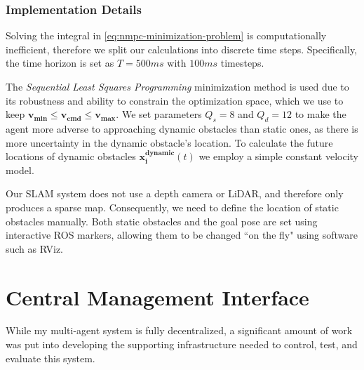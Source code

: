 \subsubsection{Implementation Details}
\label{sec:nmpc-implementation-details}
Solving the integral in \autoref{eq:nmpc-minimization-problem} is computationally inefficient, therefore we split our calculations into discrete time steps. Specifically, the time horizon is set as $T=500ms$ with $100ms$ timesteps.

The \textit{Sequential Least Squares Programming} minimization method is used due to its robustness and ability to constrain the optimization space, which we use to keep $\bm{v_{min}} \leq \bm{v_{cmd}} \leq \bm{v_{max}}$. We set parameters $Q_s = 8$ and $Q_d = 12$ to make the agent more adverse to approaching dynamic obstacles than static ones, as there is more uncertainty in the dynamic obstacle's location. To calculate the future locations of dynamic obstacles $\bm{x_i^{dynamic}}(t)$ we employ a simple constant velocity model.

Our SLAM system does not use a depth camera or LiDAR, and therefore only produces a sparse map. Consequently, we need to define the location of static obstacles manually. Both static obstacles and the goal pose are set using interactive ROS markers, allowing them to be changed ``on the fly" using software such as RViz.

\section{Central Management Interface}
\label{sec:central-management-interface}
While my multi-agent system is fully decentralized, a significant amount of work was put into developing the supporting infrastructure needed to control, test, and evaluate this system.


